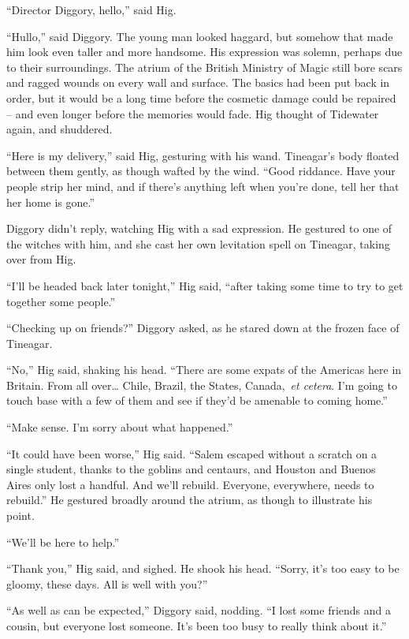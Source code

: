 ``Director Diggory, hello,'' said Hig.

``Hullo,'' said Diggory. The young man looked haggard, but somehow that
made him look even taller and more handsome. His expression was solemn,
perhaps due to their surroundings. The atrium of the British Ministry of
Magic still bore scars and ragged wounds on every wall and surface. The
basics had been put back in order, but it would be a long time before
the cosmetic damage could be repaired -- and even longer before the
memories would fade. Hig thought of Tidewater again, and shuddered.

``Here is my delivery,'' said Hig, gesturing with his wand. Tineagar's
body floated between them gently, as though wafted by the wind. ``Good
riddance. Have your people strip her mind, and if there's anything left
when you're done, tell her that her home is gone.''

Diggory didn't reply, watching Hig with a sad expression. He gestured to
one of the witches with him, and she cast her own levitation spell on
Tineagar, taking over from Hig.

``I'll be headed back later tonight,'' Hig said, ``after taking some
time to try to get together some people.''

``Checking up on friends?'' Diggory asked, as he stared down at the
frozen face of Tineagar.

``No,'' Hig said, shaking his head. ``There are some expats of the
Americas here in Britain. From all over\ldots{} Chile, Brazil, the
States, Canada,~\emph{et cetera}. I'm going to touch base with a few of
them and see if they'd be amenable to coming home.''

``Make sense. I'm sorry about what happened.''

``It could have been worse,'' Hig said. ``Salem escaped without a
scratch on a single student, thanks to the goblins and centaurs, and
Houston and Buenos Aires only lost a handful. And we'll rebuild.
Everyone, everywhere, needs to rebuild.'' He gestured broadly around the
atrium, as though to illustrate his point.

``We'll be here to help.''

``Thank you,'' Hig said, and sighed. He shook his head. ``Sorry, it's
too easy to be gloomy, these days. All is well with you?''

``As well as can be expected,'' Diggory said, nodding. ``I lost some
friends and a cousin, but everyone lost someone. It's been too busy to
really think about it.''

